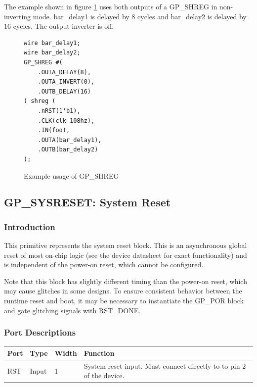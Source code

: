 \documentclass{article}
\begin{document}
The example shown in figure \ref{gp-shreg-example} uses both outputs of a GP\_SHREG in non-inverting mode. 
bar\_delay1 is delayed by 8 cycles and bar\_delay2 is delayed by 16 cycles. The output inverter is off.

\begin{figure}[h]
\begin{lstlisting}
wire bar_delay1;
wire bar_delay2;
GP_SHREG #(
	.OUTA_DELAY(8),
	.OUTA_INVERT(0),
	.OUTB_DELAY(16)
) shreg (
	.nRST(1'b1),
	.CLK(clk_108hz),
	.IN(foo),
	.OUTA(bar_delay1),
	.OUTB(bar_delay2)
);
\end{lstlisting}
\caption{Example usage of GP\_SHREG}
\label{gp-shreg-example}
\end{figure}


\pagebreak
\clearpage
\subsection{GP\_SYSRESET: System Reset}

\subsubsection{Introduction}
This primitive represents the system reset block. This is an asynchronous global reset of most on-chip logic (see the
device datasheet for exact functionality) and is independent of the power-on reset, which cannot be configured.

Note that this block has slightly different timing than the power-on reset, which may cause glitches in some designs. 
To ensure consistent behavior between the runtime reset and boot, it may be necessary to instantiate the GP\_POR 
block and gate glitching signals with RST\_DONE.

\subsubsection{Port Descriptions}

\begin{tabularx}{5in}{|l|l|l|X|}
\hline
{\bfseries Port} & {\bfseries Type} & {\bfseries Width} & {\bfseries Function} \\
\hline
RST & Input & 1 & System reset input. Must connect directly to to pin 2 of the device.\\
\hline
\end{tabularx}
\end{document}
